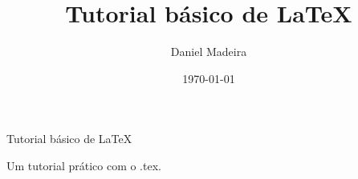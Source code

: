\documentclass[a4paper,12pt,oneside]{book}
\title{Tutorial básico de \LaTeX} %
\author{Daniel Madeira} %
\date{\today} %
\newenvironment{folharosto}[1]
	{\begin{center}
		\vspace*{\fill}
		{\LARGE #1}\par
		\vspace{2cm}
    }
    {
		\vspace*{\fill}
		\thispagestyle{empty}
		\renewcommand{\thepage}{rosto}
    \end{center}
    }
\begin{document}
\begin{titlepage}
    \maketitle %
    \thispagestyle{fancy}
    \renewcommand{\thepage}{capa} %
\end{titlepage}

\pagecolor{gray!5!yellow!5} %

\begin{folharosto}{Tutorial básico de \LaTeX}
	Um tutorial prático com o .tex.
\end{folharosto}
\end{document}
